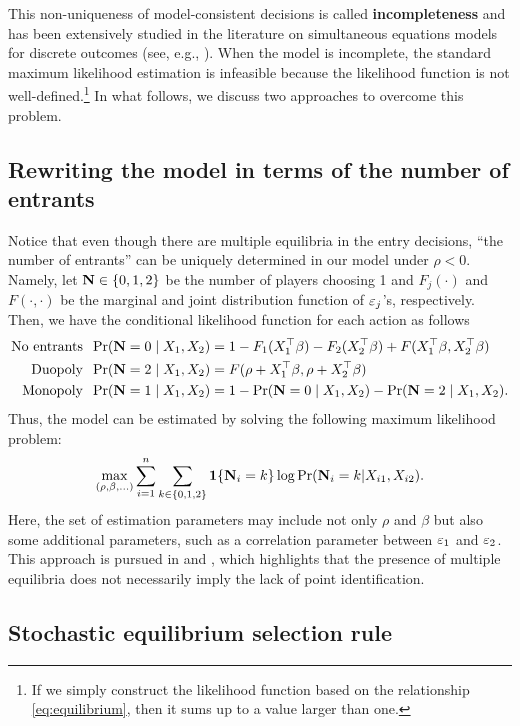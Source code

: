 \documentclass[11pt, A4paper, openany, uplatex]{book}
\begin{document}
This non-uniqueness of model-consistent decisions is called \textbf{incompleteness} and has been extensively studied in the literature on simultaneous equations models for discrete outcomes (see, e.g., \cite{tamer2003incomplete}).
When the model is incomplete, the standard maximum likelihood estimation is infeasible because the likelihood function is not well-defined.\footnote{
	If we simply construct the likelihood function based on the relationship \eqref{eq:equilibrium}, then it sums up to a value larger than one.
	}
In what follows, we discuss two approaches to overcome this problem.

\subsection{Rewriting the model in terms of the number of entrants}

Notice that even though there are multiple equilibria in the entry decisions, ``the number of entrants'' can be uniquely determined in our model under $\rho < 0$.
Namely, let $\mathbf{N} \in \{0,1,2\}$ be the number of players choosing 1 and $F_j(\cdot)$ and $F(\cdot, \cdot)$ be the marginal and joint distribution function of $\varepsilon_j$'s, respectively.
Then, we have the conditional likelihood function for each action as follows
\begin{align*}
	\text{No entrants} \;\; \Pr(\mathbf{N} = 0 \mid X_1, X_2) 
	& = 1 - F_1(X_1^\top\beta) - F_2(X_2^\top\beta) + F(X_1^\top\beta, X_2^\top\beta) \\
	\text{Duopoly} \;\; \Pr(\mathbf{N} = 2 \mid X_1, X_2) 
	& = F(\rho + X_1^\top\beta, \rho + X_2^\top\beta) \\
	\text{Monopoly} \;\; \Pr(\mathbf{N} = 1 \mid X_1, X_2)
	& = 1 - \Pr(\mathbf{N} = 0 \mid X_1, X_2) - \Pr(\mathbf{N} = 2 \mid X_1, X_2).  
\end{align*}
Thus, the model can be estimated by solving the following maximum likelihood problem:
\[
	\max_{(\rho, \beta, \ldots)} \sum_{i = 1}^n \sum_{k \in \{0,1,2\}} \mathbf{1}\{\mathbf{N}_i = k\} \log \Pr(\mathbf{N}_i = k | X_{i1}, X_{i2}).
\]
Here, the set of estimation parameters may include not only $\rho$ and $\beta$ but also some additional parameters, such as a correlation parameter between $\varepsilon_1$ and $\varepsilon_2$. 
This approach is pursued in \cite{bresnahan1990entry} and \cite{berry1992estimation}, which highlights that the presence of multiple equilibria does not necessarily imply the lack of point identification.

\subsection{Stochastic equilibrium selection rule}\label{subsec:stochastic}
\end{document}
